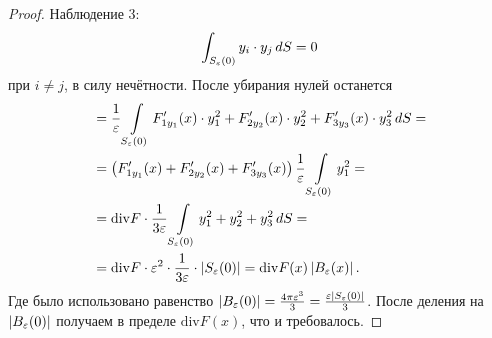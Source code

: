 \begin{proof}
 Наблюдение 3:
 \begin{align*}
  \int_{S_{\varepsilon}(0)} y_i \cdot y_j \, dS = 0
 \end{align*} при $i \neq j$, в силу нечётности. После убирания нулей останется 
 \begin{align*}
  &= \frac{1}{\varepsilon} \int\limits_{S_{\varepsilon}(0)} F'_{1y_1}(x) \cdot y_1^{2} + F'_{2y_2}(x) \cdot y_2^{2} + F'_{3y_3}(x) \cdot y_3^{2} \, dS = \\
  &= \left( F'_{1y_1}(x) + F'_{2y_2}(x) + F'_{3y_3}(x) \right) \frac{1}{\varepsilon} \int\limits_{S_{\varepsilon}(0)} y_1^{2} = \\
  &= \mathrm{div} F \cdot \frac{1}{3\varepsilon} \int\limits_{S_{\varepsilon}(0)} y_1^{2} + y_2^{2} + y_3^{2} \, dS = \\
  &= \mathrm{div} F \cdot \varepsilon^{2} \cdot \frac{1}{3\varepsilon} \cdot \left| S_{\varepsilon}(0) \right| = \mathrm{div} F(x) \left| B_{\varepsilon}(x) \right|.
 \end{align*}
Где было использовано равенство $|B_{\varepsilon}(0)| = \frac{4\pi\varepsilon^3}{3} = \frac{\varepsilon|S_{\varepsilon}(0)|}{3}$. После деления на $|B_{\varepsilon}(0)|$ получаем в пределе $\mathrm{div} F(x)$, что и требовалось.  
\end{proof}


